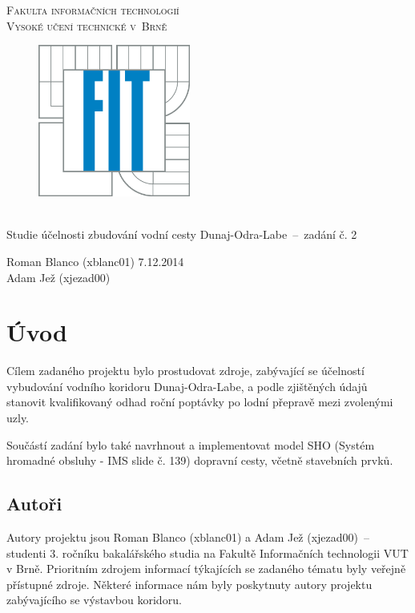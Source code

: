 \documentclass[11pt,a4paper]{article}
\begin{document}
  \begin{titlepage}
    \begin{center}
      \Huge
      \textsc{Fakulta informačních technologií\\ Vysoké učení technické v~Brně}
      \vspace{100px}
      \begin{figure}[!h]
        \centering
        \includegraphics[height=5cm]{logo}
      \end{figure}
      \\[50mm]
      \LARGE{Studie účelnosti zbudování vodní cesty Dunaj-Odra-Labe \,--\, 
             zadání č. 2}
      \vfill
    \end{center}
    \Large{Roman Blanco (xblanc01) \hfill 7.12.2014 \\
           Adam Jež (xjezad00)}
  \end{titlepage}

  \tableofcontents
  \newpage

  \section{Úvod}

    Cílem zadaného projektu bylo prostudovat zdroje, zabývající se účelností
    vybudování vodního koridoru Dunaj-Odra-Labe, a podle zjištěných údajů
    stanovit kvalifikovaný odhad roční poptávky po lodní přepravě mezi
    zvolenými uzly. 

    Součástí zadání bylo také navrhnout a implementovat model SHO
    (Systém hromadné obsluhy - IMS slide č. 139) dopravní cesty, včetně
    stavebních prvků.

    \subsection{Autoři}

      Autory projektu jsou Roman Blanco (xblanc01) a Adam Jež (xjezad00) \,--\,
      studenti 3. ročníku bakalářského studia na Fakultě Informačních
      technologii VUT v Brně. Prioritním zdrojem informací týkajících se
      zadaného tématu byly veřejně přístupné zdroje. Některé informace nám
      byly poskytnuty autory projektu zabývajícího se výstavbou koridoru.
\end{document}

